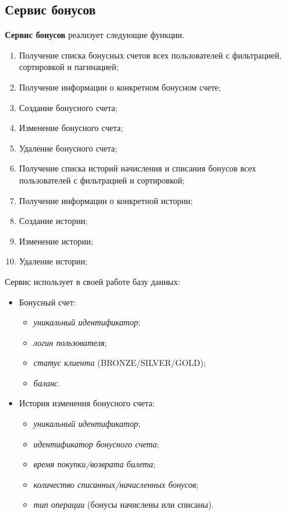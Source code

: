 \subsection{Сервис бонусов}

\textbf{Сервис бонусов} реализует следующие функции.
\begin{enumerate}
	\item Получение списка бонусных счетов всех пользователей с фильтрацией, сортировкой и пагинацией;
	\item Получение информации о конкретном бонусном счете;
	\item Создание бонусного счета;
	\item Изменение бонусного счета;
	\item Удаление бонусного счета;
	\item Получение списка историй начисления и списания бонусов всех пользователей с фильтрацией и сортировкой;
	\item Получение информации о конкретной истории;
	\item Создание истории;
	\item Изменение истории;
	\item Удаление истории;
\end{enumerate}

Сервис использует в своей работе базу данных:
\begin{itemize}
  \item Бонусный счет:
  \begin{itemize}
    \item \textit{уникальный идентификатор};
    \item \textit{логин пользователя};
    \item \textit{статус клиента} (BRONZE/SILVER/GOLD);
    \item \textit{баланс}.
  \end{itemize}

  \item История изменения бонусного счета:
  \begin{itemize}
    \item \textit{уникальный идентификатор};
    \item \textit{идентификатор бонусного счета};
    \item \textit{время покупки/возврата билета};
    \item \textit{количество списанных/начисленных бонусов};
    \item \textit{тип операции} (бонусы начислены или списаны).
  \end{itemize}
\end{itemize}


